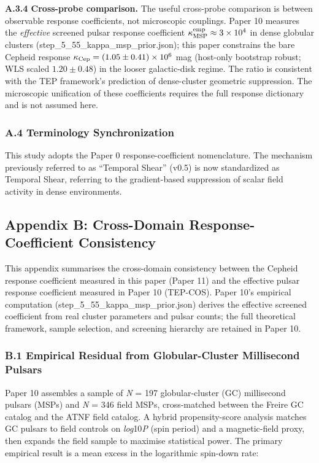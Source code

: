 \documentclass[
]{article}
\begin{document}
\textbf{A.3.4 Cross-probe comparison.} The useful cross-probe comparison
is between observable response coefficients, not microscopic couplings.
Paper 10 measures the \emph{effective} screened pulsar response
coefficient \(\kappa_{\rm MSP}^{\rm emp} \approx 3 \times 10^4\) in
dense globular clusters (step\_5\_55\_kappa\_msp\_prior.json); this
paper constrains the bare Cepheid response
\(\kappa_{\rm Cep} = (1.05 \pm 0.41) \times 10^6\) mag (host-only
bootstrap robust; WLS scaled \(1.20 \pm 0.48\)) in the looser
galactic-disk regime. The ratio is consistent with the TEP framework's
prediction of dense-cluster geometric suppression. The microscopic
unification of these coefficients requires the full response dictionary
and is not assumed here.

\subsubsection{A.4 Terminology
Synchronization}\label{a.4-terminology-synchronization}

This study adopts the Paper 0 response-coefficient nomenclature. The
mechanism previously referred to as ``Temporal Shear'' (v0.5) is now
standardized as Temporal Shear, referring to the gradient-based
suppression of scalar field activity in dense environments.

\subsection{Appendix B: Cross-Domain Response-Coefficient
Consistency}\label{appendix-b-cross-domain-response-coefficient-consistency}

This appendix summarises the cross-domain consistency between the
Cepheid response coefficient measured in this paper (Paper 11) and the
effective pulsar response coefficient measured in Paper 10 (TEP-COS).
Paper 10's empirical computation (step\_5\_55\_kappa\_msp\_prior.json)
derives the effective screened coefficient from real cluster parameters
and pulsar counts; the full theoretical framework, sample selection, and
screening hierarchy are retained in Paper 10.

\subsubsection{B.1 Empirical Residual from Globular-Cluster Millisecond
Pulsars}\label{b.1-empirical-residual-from-globular-cluster-millisecond-pulsars}

Paper 10 assembles a sample of \emph{N} = 197 globular-cluster (GC)
millisecond pulsars (MSPs) and \emph{N} = 346 field MSPs, cross-matched
between the Freire GC catalog and the ATNF field catalog. A hybrid
propensity-score analysis matches GC pulsars to field controls on
\emph{log}10\emph{P} (spin period) and a magnetic-field proxy, then
expands the field sample to maximise statistical power. The primary
empirical result is a mean excess in the logarithmic spin-down rate:
\end{document}
